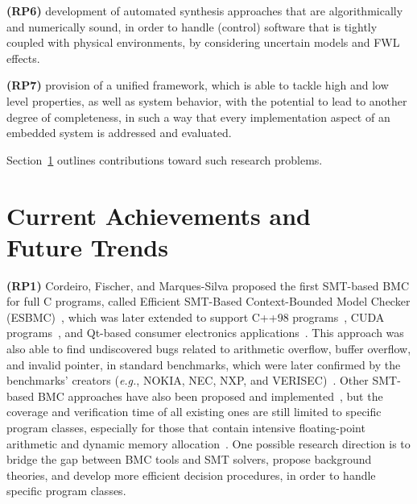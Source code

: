 \documentclass[format=acmsmall, review=false, screen=true]{acmart}
\begin{document}
\textbf{(RP6)} development of automated synthesis approaches that are algorithmically and numerically sound, in order to handle (control) software that is tightly coupled with physical environments, by considering uncertain models and FWL effects.

\textbf{(RP7)} provision of a unified framework, which is able to tackle high and low level properties, as well as system behavior, with the potential to lead to another degree of completeness, in such a way that every implementation aspect of an embedded system is addressed and evaluated.


Section~\ref{achievements} outlines contributions toward such research problems.

\section{Current Achievements and \\ Future Trends}
\label{achievements}

\textbf{(RP1)} Cordeiro, Fischer, and Marques-Silva proposed the first SMT-based BMC for full C programs, called Efficient SMT-Based Context-Bounded Model Checker (ESBMC)~\cite{Cordeiro12}, which was later extended to support C++98 programs~\cite{ECBS13}, CUDA programs~\cite{cudalucas,Pereira17}, and Qt-based consumer electronics applications~\cite{Sousa15}. This approach was also able to find undiscovered bugs related to arithmetic overflow, buffer overflow, and invalid pointer, in standard benchmarks, which were later confirmed by the benchmarks' creators ({\it e.g.}, NOKIA, NEC, NXP, and VERISEC)~\cite{CordeiroF11,Cordeiro12}. Other SMT-based BMC approaches have also been proposed and implemented~\cite{MerzFS12}, but the coverage and verification time of all existing ones are still limited to specific program classes, especially for those that contain intensive floating-point arithmetic and dynamic memory allocation~\cite{Beyer14,BeyerSVCOMP15}. One possible research direction is to bridge the gap between BMC tools and SMT solvers, propose background theories, and develop more efficient decision procedures, in order to handle specific program classes.
\end{document}
